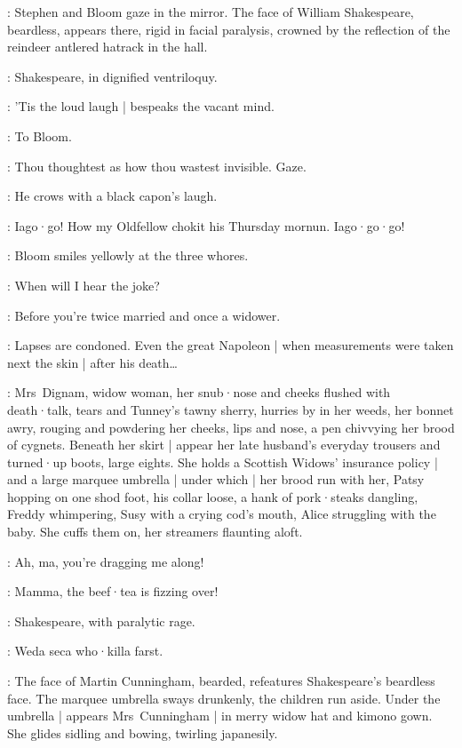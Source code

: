 :
Stephen and Bloom gaze in the mirror.
The face of William Shakespeare,
beardless,
appears there,
rigid in facial paralysis,
crowned by the reflection of the reindeer antlered hatrack in the hall.

:
Shakespeare,
in dignified ventriloquy.

\Shakespeare:
'Tis the loud laugh |
bespeaks the vacant mind.

:
To Bloom.

\Shakespeare:
Thou thoughtest as how thou wastest invisible.
Gaze.

:
He crows with a black capon's laugh.

\Shakespeare:
Iago·go!
How my Oldfellow chokit his Thursday mornun.
Iago·go·go!

:
Bloom smiles yellowly at the three whores.

\Bloom:
When will I hear the joke?

\Zoe:
Before you're twice married and once a widower.

\Bloom:
Lapses are condoned.
Even the great Napoleon |
when measurements were taken next the skin |
after his death…

:
Mrs~Dignam,
widow woman,
her snub·nose and cheeks flushed with death·talk,
tears and Tunney's tawny sherry,
hurries by in her weeds,
her bonnet awry,
rouging and powdering her cheeks,
lips and nose,
a pen chivvying her brood of cygnets.
%
Beneath her skirt |
appear her late husband's everyday trousers and turned·up boots,
large eights.
She holds a Scottish Widows' insurance policy |
and a large marquee umbrella |
under which |
her brood run with her,
Patsy hopping on one shod foot,
his collar loose,
a hank of pork·steaks dangling,
Freddy whimpering,
Susy with a crying cod's mouth,
Alice struggling with the baby.
She cuffs them on,
her streamers flaunting aloft.

\Freddy[5a]:
Ah,
ma,
you're dragging me along!

\Susy[5b]:
Mamma,
the beef·tea is fizzing over!

:
Shakespeare,
with paralytic rage.

\Shakespeare:
Weda seca who·killa farst.

:
The face of Martin Cunningham,
bearded,
refeatures Shakespeare's beardless face.
The marquee umbrella sways drunkenly,
the children run aside.
Under the umbrella |
appears Mrs~Cunningham |
in merry widow hat and kimono gown.
She glides sidling and bowing,
twirling japanesily.

